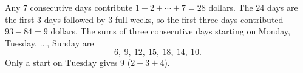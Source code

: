 Any $7$ consecutive days contribute $1+2+\cdots+7=28$ dollars. The $24$ days are the first $3$ days followed by $3$ full weeks, so the first three days contributed $93-84=9$ dollars. The sums of three consecutive days starting on Monday, Tuesday, $\dots$, Sunday are
\[6,\ 9,\ 12,\ 15,\ 18,\ 14,\ 10.\]
Only a start on $\boxed{\text{Tuesday}}$ gives $9$ ($2+3+4$).

